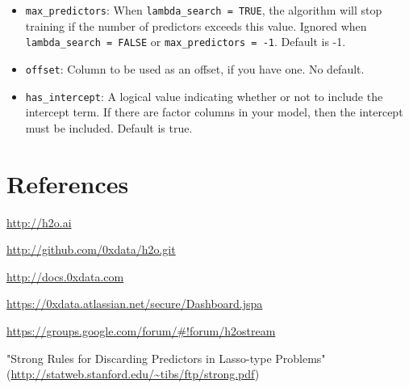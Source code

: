 \documentclass[11pt]{article}
\begin{document}
\begin{itemize}
\item \texttt{max\_predictors}: When \texttt{lambda\_search = TRUE}, the algorithm will stop training if the number of predictors exceeds this value. Ignored when \texttt{ lambda\_search = FALSE} or \texttt{max\_predictors = -1}. Default is -1.
\item \texttt{offset}: Column to be used as an offset, if you have one. No default.
\item \texttt{has\_intercept}: A logical value indicating whether or not to include the intercept term. If there are factor columns in your model, then the intercept must be included. Default is true.


\end{itemize}



\newpage
\section{References}


\url{http://h2o.ai}

\url{http://github.com/0xdata/h2o.git}

\url{http://docs.0xdata.com}

\url{https://0xdata.atlassian.net/secure/Dashboard.jspa}

\url{https://groups.google.com/forum/#!forum/h2ostream}

"Strong Rules for Discarding Predictors in Lasso-type Problems" (\url{http://statweb.stanford.edu/~tibs/ftp/strong.pdf})
\end{document}
